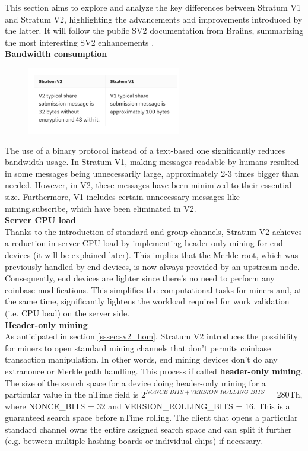 This section aims to explore and analyze the key differences between Stratum V1 and Stratum V2, highlighting the advancements and improvements introduced by the latter. It will follow the public SV2 documentation from Braiins, summarizing the most interesting SV2 enhancements \cite{braiinsStratumNext}.\\

\noindent\textbf{Bandwidth consumption}

\begin{figure}
    \centering
    \includegraphics[width=0.6\textwidth]{Figures/sv2/sv2_5.png}
\end{figure}
\noindent The use of a binary protocol instead of a text-based one significantly reduces bandwidth usage.
In Stratum V1, making messages readable by humans resulted in some messages being unnecessarily large, approximately 2-3 times bigger than needed. 
However, in V2, these messages have been minimized to their essential size. Furthermore, V1 includes certain unnecessary messages like mining.subscribe, which have been eliminated in V2.\\

\noindent\textbf{Server CPU load}\\
Thanks to the introduction of standard and group channels, Stratum V2 achieves a reduction in server CPU load by implementing header-only mining for end devices (it will be explained later). This implies that the Merkle root, which was previously handled by end devices, is now always provided by an upstream node. Consequently, end devices are lighter since there's no need to perform any coinbase modifications. This simplifies the computational tasks for miners and, at the same time, significantly lightens the workload required for work validation (i.e. CPU load) on the server side.\\

\noindent\textbf{Header-only mining}\\
As anticipated in section \ref{sssec:sv2_hom}, Stratum V2 introduces the possibility for miners to open standard mining channels that don't permits coinbase transaction manipulation. In other words, end mining devices don't do any extranonce or Merkle path handling. This process if called \textbf{header-only mining}. The size of the search space for a device doing header-only mining for a particular value in the nTime field is $2^{NONCE\_BITS + VERSION\_ROLLING\_BITS}$ = 280Th, where NONCE\_BITS = 32 and VERSION\_ROLLING\_BITS = 16. This is a guaranteed search space before nTime rolling. The client that opens a particular standard channel owns the entire assigned search space and can split it further (e.g. between multiple hashing boards or individual chips) if necessary.\\

